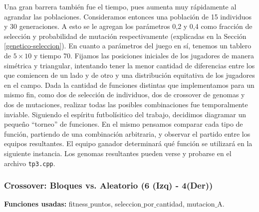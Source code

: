 Una gran barrera también fue el tiempo, pues aumenta muy rápidamente al agrandar las poblaciones.
Consideramos entonces una población de 15 individuos y 30 generaciones. A esto se le agregan los parámetros 0,2 y 0,4 como fracción de selección y probabilidad de mutación respectivamente (explicadas en la Sección \ref{genetico-seleccion}).
En cuanto a parámetros del juego en sí, tenemos un tablero de $5\times10$ y tiempo 70.
Fijamos las posiciones iniciales de los jugadores de manera simétrica y triangular, intentando tener la menor cantidad de diferencias entre los que comiencen de un lado y de otro y una distribución equitativa de los jugadores en el campo.
Dada la cantidad de funciones distintas que implementamos para un mismo fin, como dos de selección de individuos, dos de crossover de genomas y dos de mutaciones, realizar todas las posibles combinaciones fue temporalmente inviable. Siguiendo el espíritu futbolísitico del trabajo, decidimos diagramar un pequeño ``torneo'' de funciones. En el mismo pensamos comparar cada tipo de función, partiendo de una combinación arbitraria, y observar el partido entre los equipos resultantes. El equipo ganador determinará qué función se utilizará en la siguiente instancia. Los genomas resultantes pueden verse y probarse en el archivo \texttt{tp3.cpp}.




\subsubsection*{Crossover: Bloques vs. Aleatorio (6 (Izq) - 4(Der))}

\textbf{Funciones usadas: } fitness$\_$puntos, seleccion$\_$por$\_$cantidad, mutacion$\_$A.





